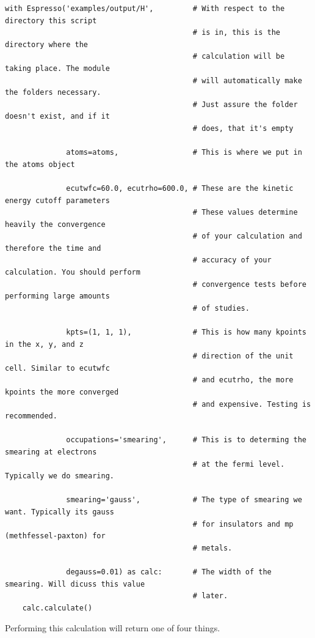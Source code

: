 \documentclass[colorlinks=true,urlcolor=blue,linkcolor=blue,citecolor=red]{article}
\begin{document}
\begin{verbatim}
with Espresso('examples/output/H',         # With respect to the directory this script
                                           # is in, this is the directory where the
                                           # calculation will be taking place. The module
                                           # will automatically make the folders necessary.
                                           # Just assure the folder doesn't exist, and if it
                                           # does, that it's empty

              atoms=atoms,                 # This is where we put in the atoms object

              ecutwfc=60.0, ecutrho=600.0, # These are the kinetic energy cutoff parameters
                                           # These values determine heavily the convergence
                                           # of your calculation and therefore the time and
                                           # accuracy of your calculation. You should perform
                                           # convergence tests before performing large amounts
                                           # of studies.

              kpts=(1, 1, 1),              # This is how many kpoints in the x, y, and z
                                           # direction of the unit cell. Similar to ecutwfc
                                           # and ecutrho, the more kpoints the more converged
                                           # and expensive. Testing is recommended.

              occupations='smearing',      # This is to determing the smearing at electrons
                                           # at the fermi level. Typically we do smearing.

              smearing='gauss',            # The type of smearing we want. Typically its gauss
                                           # for insulators and mp (methfessel-paxton) for
                                           # metals.

              degauss=0.01) as calc:       # The width of the smearing. Will dicuss this value
                                           # later.
    calc.calculate()
\end{verbatim}

Performing this calculation will return one of four things.
\end{document}
